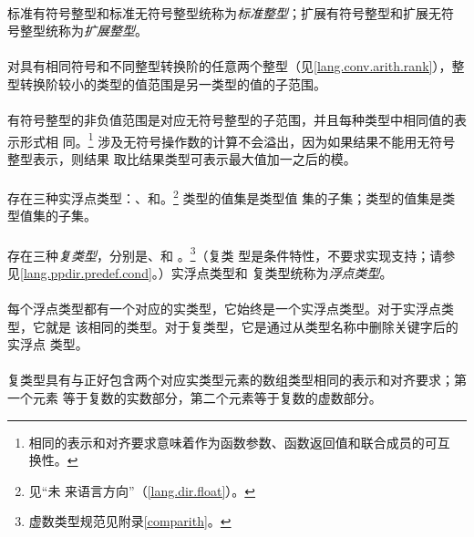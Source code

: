 {\paragraph{}
标准有符号整型和标准无符号整型统称为\textit{标准整型}；扩展有符号整型和扩展无符
号整型统称为\textit{扩展整型}。

\paragraph{}
对具有相同符号和不同整型转换阶的任意两个整型（见\ref{lang.conv.arith.rank}），整
型转换阶较小的类型的值范围是另一类型的值的子范围。

\paragraph{}
有符号整型的非负值范围是对应无符号整型的子范围，并且每种类型中相同值的表示形式相
同。\footnote{相同的表示和对齐要求意味着作为函数参数、函数返回值和联合成员的可互
换性。} 涉及无符号操作数的计算不会溢出，因为如果结果不能用无符号整型表示，则结果
取比结果类型可表示最大值加一之后的模。

\paragraph{}
存在三种实浮点类型：、和。\footnote{见``未
来语言方向''（\ref{lang.dir.float}）。 } 类型的值集是类型值
集的子集；类型的值集是类型值集的子集。

\paragraph{}
存在三种\textit{复类型}，分别是、和
。\footnote{虚数类型规范见附录\ref{comparith}。}（复类
型是条件特性，不要求实现支持；请参见\ref{lang.ppdir.predef.cond}。）实浮点类型和
复类型统称为\textit{浮点类型}。

\paragraph{}
每个浮点类型都有一个对应的实类型，它始终是一个实浮点类型。对于实浮点类型，它就是
该相同的类型。对于复类型，它是通过从类型名称中删除关键字后的实浮点
类型。

\paragraph{}
复类型具有与正好包含两个对应实类型元素的数组类型相同的表示和对齐要求；第一个元素
等于复数的实数部分，第二个元素等于复数的虚数部分。

}
